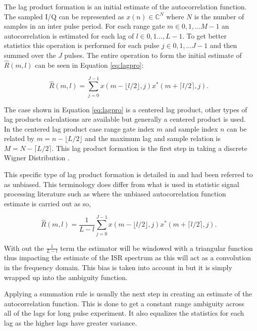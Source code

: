 \documentclass[draft,ras]{agutex}
\begin{document}
\begin{article}
The lag product formation is an initial estimate of the autocorrelation function. The sampled I/Q can be represented as $x(n) \in\mathbb{C}^N$ where $N$ is the number of samples in an inter pulse period. For each range gate $m\in 0,1,...M-1$ an autocorrelation is estimated for each lag of $l \in 0,1...,L-1$.  To get better statistics this operation is performed for each pulse $j\in 0,1,...J-1$ and then summed over the $J$ pulses. The entire operation to form the initial estimate of $\hat{R}(m,l)$ can be seen in Equation \ref{eq:lagpro}:

\begin{equation}
\label{eq:lagpro}
\hat{R}(m,l) = \displaystyle\sum\limits_{j=0}^{J-1} x(m-\lfloor l/2\rfloor,j)x^*(m+\lceil l/2 \rceil,j).
\end{equation}

The case shown in Equation \ref{eq:lagpro} is a centered lag product, other types of lag products calculations are available but generally a centered product is used. In the centered lag product case range gate index $m$ and sample index $n$ can be related by $m=n-\lfloor L/2\rfloor$ and the maximum lag and sample relation is $M=N-\lceil L/2 \rceil$.  This lag product formation is the first step in taking a discrete Wigner Distribution \citep{TFAcohen}.

This specific type of lag product formation is detailed in \citep{farley1969} and had been referred to as unbiased. This terminology does differ from what is used in statistic signal processing literature such as \citep{randomsigshanmugan} where the unbiased autocorrelation function estimate is carried out as so,

\begin{equation}
\label{eq:lagproub}
\hat{R}(m,l) = \frac{1}{L-l}\displaystyle\sum\limits_{j=0}^{J-1} x(m-\lfloor l/2\rfloor,j)x^*(m+\lceil l/2 \rceil,j).
\end{equation}

\noindent With out the $\frac{1}{L-l}$ term the estimator will be windowed with a triangular function thus impacting the estimate of the ISR spectrum as this will act as a convolution in the frequency domain. This bias is taken into account in \citep{farley1969} but it is simply wrapped up into the ambiguity function. 

Applying a summation rule is usually the next step in creating an estimate of the autocorrelation function.  This is done to get a constant range ambiguity across all of the lags for long pulse experiment\citep{nygren1996}. It also equalizes the statistics for each lag as the higher lags have greater variance. 


\end{article}
\end{document}
